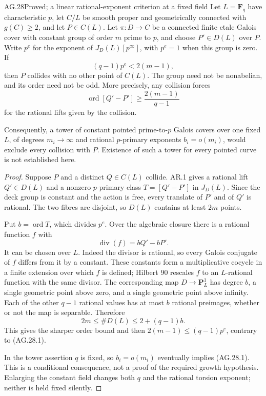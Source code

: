 \begin{claim}{AG.28}{Proved; a linear rational-exponent criterion at a fixed field}
Let $L=\mathbf F_q$ have characteristic $p$, let $C/L$
be smooth proper and geometrically connected with $g(C)\ge2$,
and let $P\in C(L)$. Let $\pi:D\to C$ be a connected
finite etale Galois cover with constant group of order $m$
prime to $p$, and choose $P'\in D(L)$ over $P$.
Write $p^e$ for the exponent of $J_D(L)[p^\infty]$,
with $p^e=1$ when this group is zero. If
\[
                       (q-1)p^e<2(m-1),                \tag{AG.28.1}
\]
then $P$ collides with no other point of $C(L)$.
The group need not be nonabelian, and its order need not
be odd. More precisely, any collision forces
\[
 \operatorname{ord}[Q'-P']\ge\frac{2(m-1)}{q-1}
\]
for the rational lifts given by the collision.

Consequently, a tower of constant pointed prime-to-$p$
Galois covers over one fixed $L$, of degrees $m_i\to\infty$
and rational $p$-primary exponents $b_i=o(m_i)$, would
exclude every collision with $P$. Existence of such a tower
for every pointed curve is not established here.
\end{claim}
\begin{proof}
Suppose $P$ and a distinct $Q\in C(L)$ collide.
AR.1 gives a rational lift $Q'\in D(L)$ and a
nonzero $p$-primary class $T=[Q'-P']$ in $J_D(L)$.
Since the deck group is constant and the action is free,
every translate of $P'$ and of $Q'$ is rational.
The two fibres are disjoint, so $D(L)$ contains at least
$2m$ points.

Put $b=\operatorname{ord}T$, which divides $p^e$.
Over the algebraic closure there is a rational function
$f$ with
\[
                         \operatorname{div}(f)=bQ'-bP'.
\]
It can be chosen over $L$. Indeed the divisor is rational,
so every Galois conjugate of $f$ differs from it by a
constant. These constants form a multiplicative cocycle
in a finite extension over which $f$ is defined; Hilbert 90
rescales $f$ to an $L$-rational function with the same
divisor. The corresponding map $D\to\mathbf P^1_L$
has degree $b$, a single geometric point above zero,
and a single geometric point above infinity. Each of the
other $q-1$ rational values has at most $b$ rational
preimages, whether or not the map is separable. Therefore
\[
                        2m\le\#D(L)\le2+(q-1)b.
\]
This gives the sharper order bound and then
$2(m-1)\le(q-1)p^e$, contrary to (AG.28.1).

In the tower assertion $q$ is fixed, so $b_i=o(m_i)$
eventually implies (AG.28.1). This is a conditional
consequence, not a proof of the required growth hypothesis.
Enlarging the constant field changes both $q$ and the
rational torsion exponent; neither is held fixed silently.
\end{proof}


